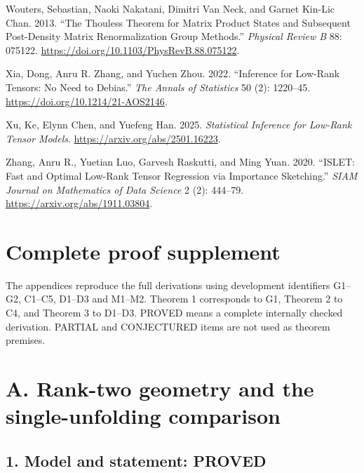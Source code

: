 \documentclass[
  11pt,
]{article}
\newlength{\cslhangindent}
\newenvironment{CSLReferences}[2] %
 {\begin{list}{}{%
  \setlength{\itemindent}{0pt}
  \setlength{\leftmargin}{0pt}
  \setlength{\parsep}{0pt}
  \ifodd #1
   \setlength{\leftmargin}{\cslhangindent}
   \setlength{\itemindent}{-1\cslhangindent}
  \fi
  \setlength{\itemsep}{#2\baselineskip}}}
 {\end{list}}
\begin{document}
\begin{CSLReferences}{1}{1}
Wouters, Sebastian, Naoki Nakatani, Dimitri Van Neck, and Garnet Kin-Lic
Chan. 2013. {``The Thouless Theorem for Matrix Product States and
Subsequent Post-Density Matrix Renormalization Group Methods.''}
\emph{Physical Review B} 88: 075122.
\url{https://doi.org/10.1103/PhysRevB.88.075122}.

Xia, Dong, Anru R. Zhang, and Yuchen Zhou. 2022. {``Inference for
Low-Rank Tensors: No Need to Debias.''} \emph{The Annals of Statistics}
50 (2): 1220--45. \url{https://doi.org/10.1214/21-AOS2146}.

Xu, Ke, Elynn Chen, and Yuefeng Han. 2025. \emph{Statistical Inference
for Low-Rank Tensor Models}. \url{https://arxiv.org/abs/2501.16223}.

Zhang, Anru R., Yuetian Luo, Garvesh Raskutti, and Ming Yuan. 2020.
{``{ISLET}: Fast and Optimal Low-Rank Tensor Regression via Importance
Sketching.''} \emph{SIAM Journal on Mathematics of Data Science} 2 (2):
444--79. \url{https://arxiv.org/abs/1911.03804}.

\end{CSLReferences}

\newpage

\section*{Complete proof supplement}\label{complete-proof-supplement}

The appendices reproduce the full derivations using development
identifiers G1--G2, C1--C5, D1--D3 and M1--M2. Theorem 1 corresponds to
G1, Theorem 2 to C4, and Theorem 3 to D1--D3. PROVED means a complete
internally checked derivation. PARTIAL and CONJECTURED items are not
used as theorem premises.

\newpage

\section{A. Rank-two geometry and the single-unfolding
comparison}\label{a.-rank-two-geometry-and-the-single-unfolding-comparison}

\subsection{1. Model and statement:
PROVED}\label{model-and-statement-proved}
\end{document}
